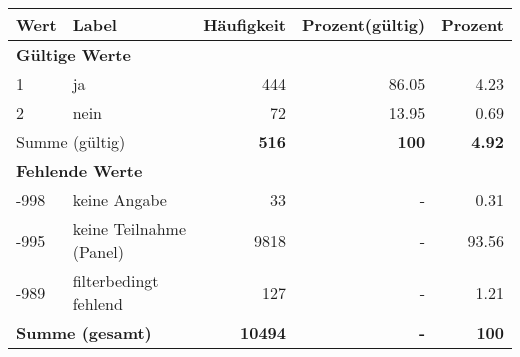      \begin{longtable}{lXrrr}
     \toprule
     \textbf{Wert} & \textbf{Label} & \textbf{Häufigkeit} & \textbf{Prozent(gültig)} & \textbf{Prozent} \\
     \endhead
     \midrule
     \multicolumn{5}{l}{\textbf{Gültige Werte}}\\

     1 &
     \multicolumn{1}{X}{ ja   } &


       \num{444} &
       \num[round-mode=places,round-precision=2]{86,05} &
         \num[round-mode=places,round-precision=2]{4,23} \\

     2 &
     \multicolumn{1}{X}{ nein   } &


       \num{72} &
       \num[round-mode=places,round-precision=2]{13,95} &
         \num[round-mode=places,round-precision=2]{0,69} \\
     \midrule
     \multicolumn{2}{l}{Summe (gültig)} &
       \textbf{\num{516}} &
     \textbf{100} &
       \textbf{\num[round-mode=places,round-precision=2]{4,92}} \\
     \multicolumn{5}{l}{\textbf{Fehlende Werte}}\\
       -998 &
       keine Angabe &
         \num{33} &
        - &
         \num[round-mode=places,round-precision=2]{0,31} \\
       -995 &
       keine Teilnahme (Panel) &
         \num{9818} &
        - &
         \num[round-mode=places,round-precision=2]{93,56} \\
       -989 &
       filterbedingt fehlend &
         \num{127} &
        - &
         \num[round-mode=places,round-precision=2]{1,21} \\
     \midrule
     \multicolumn{2}{l}{\textbf{Summe (gesamt)}} &
          \textbf{\num{10494}} &
        \textbf{-} &
        \textbf{100} \\
     \bottomrule
     \end{longtable}
     
